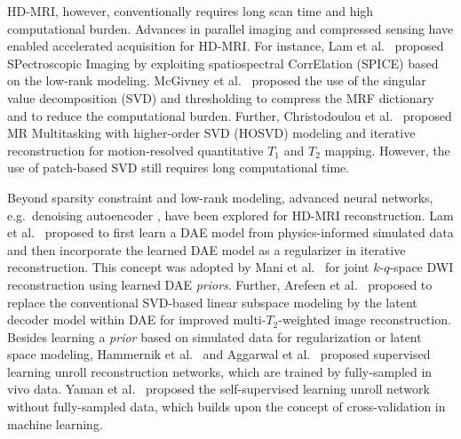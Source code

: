 \documentclass[journal,twoside,web]{ieeecolor}
\begin{document}
	HD-MRI, however, conventionally requires long scan time
	and high computational burden.
	Advances in parallel imaging
	\cite{roemer_1990_pi,sodickson_1997_smash,
	pruessmann_1999_sense,pruessmann_2001_gsense,griswold_2002_grappa}
	and compressed sensing
	\cite{lustig_2007_cs,block_2007_cs,liang_2007_psf}
	have enabled accelerated acquisition for HD-MRI. For instance,
	Lam et al.~\cite{lam_2014_spice} proposed SPectroscopic Imaging
	by exploiting spatiospectral CorrElation (SPICE)
	based on the low-rank modeling.
	McGivney et al.~\cite{mcgivney_2014_svdmrf}
	proposed the use of the singular value decomposition (SVD) and thresholding
	to compress the MRF dictionary and to reduce the computational burden.
	Further, Christodoulou et al.~\cite{christodoulou_2018_mt}
	proposed MR Multitasking with higher-order SVD (HOSVD) modeling
	and iterative reconstruction
	for motion-resolved quantitative $T_1$ and $T_2$ mapping.
    However, the use of patch-based SVD still requires long computational time.

	Beyond sparsity constraint and low-rank modeling,
	advanced neural networks, e.g.~denoising autoencoder \cite{hinton_2006_ae},
	have been explored for HD-MRI reconstruction.
	Lam et al.~\cite{lam_2019_mrsi} proposed
	to first learn a DAE model
	from physics-informed simulated data
	and then incorporate the learned DAE model as a regularizer
	in iterative reconstruction.
	This concept was adopted by Mani et al.~\cite{mani_2021_qmodel}
	for joint $k$-$q$-space DWI reconstruction using learned DAE \textit{priors}.
	Further, Arefeen et al.~\cite{arefeen_2023_latent} proposed
	to replace the conventional SVD-based linear subspace modeling
    \cite{huang_2012_t2basis}
	by the latent decoder model within DAE
	for improved multi-$T_2$-weighted image reconstruction.
	Besides learning a \textit{prior} based on simulated data
	for regularization or latent space modeling,
	Hammernik et al.~\cite{hammernik_2018_varnet} and
	Aggarwal et al.~\cite{aggarwal_2018_modl}
	proposed supervised learning unroll reconstruction networks,
	which are trained by fully-sampled in vivo data.
	Yaman et al.~\cite{yaman_2020_ssdu,yaman_2022_zs}
	proposed the self-supervised learning unroll network
    without fully-sampled data,
	which builds upon the concept of cross-validation in machine learning.
\end{document}
